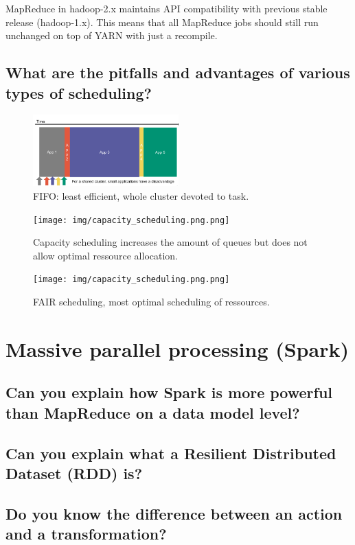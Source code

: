 \documentclass{article}
\begin{document}
MapReduce in hadoop-2.x maintains API compatibility with previous stable release (hadoop-1.x). This means that all MapReduce jobs should still run unchanged on top of YARN with just a recompile.


\subsection{What are the pitfalls and advantages of various types of scheduling?}

\begin{figure}
  \centering
  \includegraphics[width=0.5\textwidth]{img/fifo.png}
  \caption{FIFO: least efficient, whole cluster devoted to task.}
  \label{fig:fifo}
\end{figure}

\begin{figure}
  \centering
  \texttt{[image: img/capacity\_scheduling.png.png]}
  \caption{Capacity scheduling increases the amount of queues but does not allow optimal ressource allocation.}
  \label{fig:capsched}
\end{figure}

\begin{figure}
  \centering
  \texttt{[image: img/capacity\_scheduling.png.png]}
  \caption{FAIR scheduling, most optimal scheduling of ressources.}
  \label{fig:fairsched}
\end{figure}

\pagebreak

\section{Massive parallel processing (Spark)}
\subsection{Can you explain how Spark is more powerful than MapReduce on a data model level?}
\subsection{Can you explain what a Resilient Distributed Dataset (RDD) is?}
\subsection{Do you know the difference between an action and a transformation?}
\end{document}
